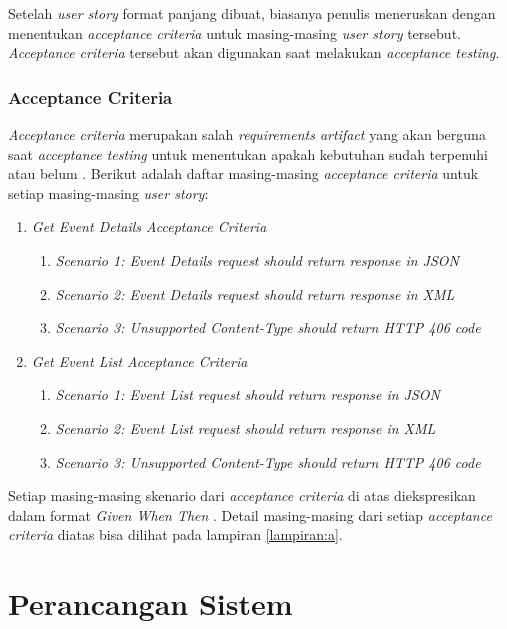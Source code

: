 \documentclass[a4paper, 12pt, oneside]{report}
\begin{document}
\onehalfspacing Setelah \textit{user story} format panjang dibuat, biasanya penulis meneruskan dengan menentukan \textit{acceptance criteria} untuk masing-masing \textit{user story} tersebut. \textit{Acceptance criteria} tersebut akan digunakan saat melakukan \textit{acceptance testing}.

\subsection{Acceptance Criteria}

\onehalfspacing \textit{Acceptance criteria} merupakan salah \textit{requirements artifact} yang akan berguna saat \textit{acceptance testing} untuk menentukan apakah kebutuhan sudah terpenuhi atau belum \cite{acceptance-testing-wikipedia}. Berikut adalah daftar masing-masing \textit{acceptance criteria} untuk setiap masing-masing \textit{user story}:
\begin{enumerate}
  \item \textit{Get Event Details Acceptance Criteria}
    \begin{enumerate}
      \item \textit{Scenario 1: Event Details request should return response in JSON}
      \item \textit{Scenario 2: Event Details request should return response in XML}
      \item \textit{Scenario 3: Unsupported Content-Type should return HTTP 406 code}
    \end{enumerate}
  \item \textit{Get Event List Acceptance Criteria}
    \begin{enumerate}
      \item \textit{Scenario 1: Event List request should return response in JSON}
      \item \textit{Scenario 2: Event List request should return response in XML}
      \item \textit{Scenario 3: Unsupported Content-Type should return HTTP 406 code}
    \end{enumerate}
\end{enumerate}

\onehalfspacing Setiap masing-masing skenario dari \textit{acceptance criteria} di atas diekspresikan dalam format \textit{Given When Then} \cite{introducing-bdd}\cite{whats-in-story}. Detail masing-masing dari setiap \textit{acceptance criteria} diatas bisa dilihat pada lampiran \ref{lampiran:a}.

\chapter{Perancangan Sistem}
\end{document}
